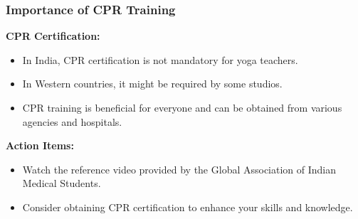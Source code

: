 \begin{frame}[fragile]\frametitle{Importance of CPR Training}
    \textbf{CPR Certification:}
    \begin{itemize}
        \item In India, CPR certification is not mandatory for yoga teachers.
        \item In Western countries, it might be required by some studios.
        \item CPR training is beneficial for everyone and can be obtained from various agencies and hospitals.
    \end{itemize}
    
    \textbf{Action Items:}
    \begin{itemize}
        \item Watch the reference video provided by the Global Association of Indian Medical Students.
        \item Consider obtaining CPR certification to enhance your skills and knowledge.
    \end{itemize}
\end{frame}


